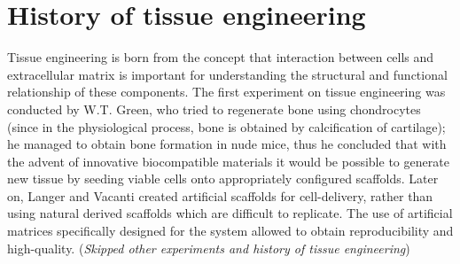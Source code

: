\section{History of tissue engineering}
  Tissue engineering is born from the concept that interaction between cells and extracellular matrix is important for understanding the structural and functional relationship of these components.
  The first experiment on tissue engineering was conducted by W.T. Green, who tried to regenerate bone using chondrocytes (since in the physiological process, bone is obtained by calcification of cartilage); he managed to obtain bone formation in nude mice, thus he concluded that with the advent of innovative biocompatible materials it would be possible to generate new tissue by seeding viable cells onto appropriately configured scaffolds.
  Later on, Langer and Vacanti created artificial scaffolds for cell-delivery, rather than using natural derived scaffolds which are difficult to replicate. The use of artificial matrices specifically designed for the system allowed to obtain reproducibility and high-quality.
  (\textit{Skipped other experiments and history of tissue engineering})

